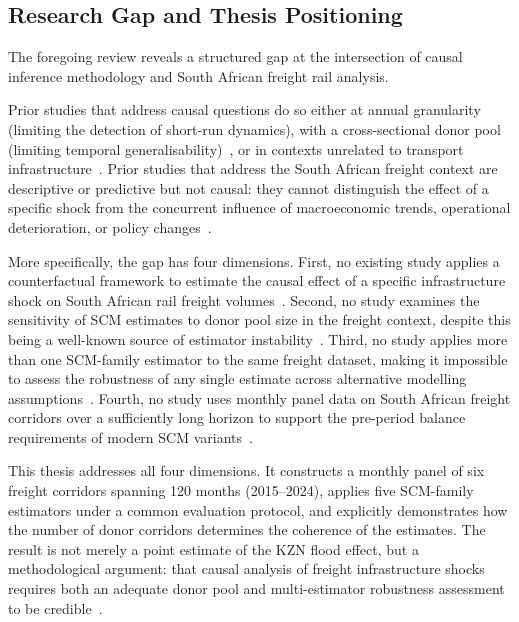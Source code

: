 \subsection{Research Gap and Thesis Positioning}
\label{sec:gap_statement}

The foregoing review reveals a structured gap at the intersection of
causal inference methodology and South African freight rail analysis.

Prior studies that address causal questions do so either at annual
granularity (limiting the detection of short-run dynamics), with a
cross-sectional donor pool (limiting temporal
generalisability)~\parencite{abadie2003, abadie2010}, or in contexts
unrelated to transport infrastructure~\parencite{cavallo2013}.
Prior studies that address the South African freight context are
descriptive or predictive but not causal: they cannot distinguish
the effect of a specific shock from the concurrent influence of
macroeconomic trends, operational deterioration, or policy
changes~\parencite{stander2005, havenga2021}.

More specifically, the gap has four dimensions.
First, no existing study applies a counterfactual framework to
estimate the causal effect of a specific infrastructure shock on
South African rail freight volumes~\parencite{havenga2021}.
Second, no study examines the sensitivity of SCM estimates to donor
pool size in the freight context, despite this being a well-known
source of estimator instability~\parencite{abadie2003, benmichael2021}.
Third, no study applies more than one SCM-family estimator to the
same freight dataset, making it impossible to assess the robustness
of any single estimate across alternative modelling
assumptions~\parencite{benmichael2021, athey2021}.
Fourth, no study uses monthly panel data on South African freight
corridors over a sufficiently long horizon to support the
pre-period balance requirements of modern SCM
variants~\parencite{arkhangelsky2021}.

This thesis addresses all four dimensions.
It constructs a monthly panel of six freight corridors spanning
120 months (2015--2024), applies five SCM-family estimators under
a common evaluation protocol, and explicitly demonstrates how the
number of donor corridors determines the coherence of the estimates.
The result is not merely a point estimate of the KZN flood effect,
but a methodological argument: that causal analysis of freight
infrastructure shocks requires both an adequate donor pool and
multi-estimator robustness assessment to be credible~\parencite{benmichael2021}.
